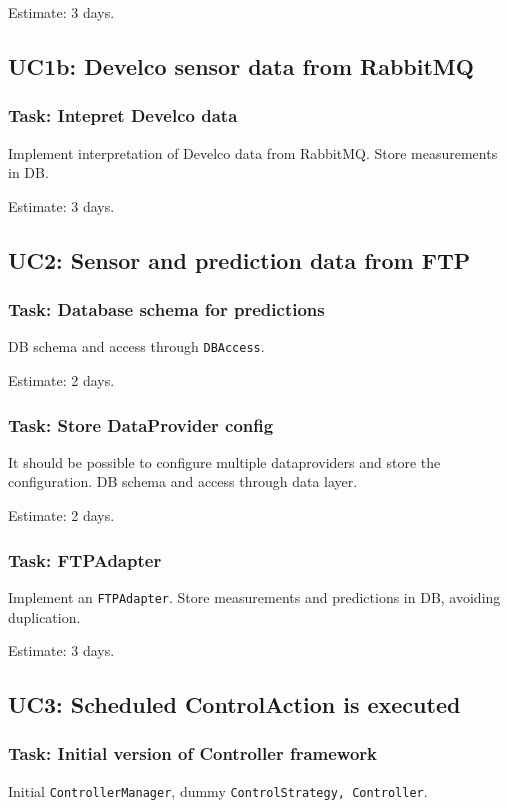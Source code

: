 Estimate: 3 days.

\subsection*{UC1b: Develco sensor data from RabbitMQ}
\subsubsection{Task: Intepret Develco data}
Implement interpretation of Develco data from RabbitMQ. Store measurements in DB.

Estimate: 3 days.

\subsection*{UC2: Sensor and prediction data from FTP}
\subsubsection{Task: Database schema for predictions}
DB schema and access through \texttt{DBAccess}.

Estimate: 2 days.

\subsubsection{Task: Store DataProvider config}
It should be possible to configure multiple dataproviders and store the configuration. DB schema and access through data layer.

Estimate: 2 days.

\subsubsection{Task: FTPAdapter}
Implement an \texttt{FTPAdapter}. Store measurements and predictions in DB, avoiding duplication.

Estimate: 3 days.

\subsection*{UC3: Scheduled ControlAction is executed}
\subsubsection{Task: Initial version of Controller framework}
Initial \texttt{ControllerManager}, dummy \texttt{ControlStrategy, Controller}.

